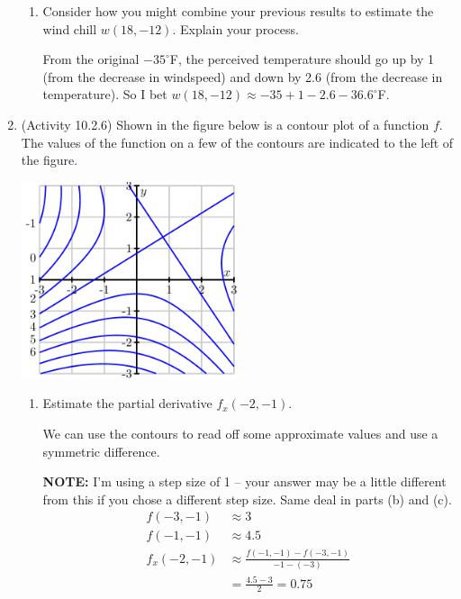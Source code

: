 \documentclass[10pt]{article}
\newenvironment{red}{\color{red}}{\ignorespacesafterend}
\begin{document}
\begin{enumerate}[leftmargin=0pt]
\begin{enumerate}
    \item Consider how you might combine your previous results to estimate the wind chill $w(18, -12)$. Explain your process.
    
    \begin{red}
    From the original $-35^\circ$F, the perceived temperature should go up by 1 (from the decrease in windspeed) and down by 2.6 (from the decrease in temperature). So I bet $w(18, -12) \approx -35 + 1 - 2.6 -36.6^\circ$F.
    \end{red}
\end{enumerate}
\item (Activity 10.2.6) Shown in the figure below is a contour plot of a function $f$. The values of the function on a few of the contours are indicated to the left of the figure.
\begin{center}
    \includegraphics[width=0.5\textwidth]{203-keys/ps7-answer-key/10-2-6.png}
\end{center}
\begin{enumerate}
    \item Estimate the partial derivative $f_x(-2, -1).$
    
    \begin{red}
    We can use the contours to read off some approximate values and use a symmetric difference. 
    
    \textbf{NOTE:} I'm using a step size of 1 -- your answer may be a little different from this if you chose a different step size. Same deal in parts (b) and (c).
    \begin{align*}
        f(-3, -1) &\approx 3 \\
        f(-1, -1) &\approx 4.5 \\
        f_x(-2,-1) &\approx 
        \frac{f(-1, -1)-f(-3, -1)}{-1-(-3)} \\
        &= \frac{4.5-3}{2} = 0.75
    \end{align*}
    \end{red}
    

\end{enumerate}
\end{enumerate}
\end{document}
